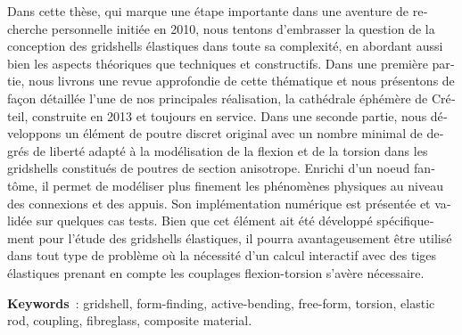 \begin{otherlanguage}{french}
Dans cette thèse, qui marque une étape importante dans une aventure de recherche personnelle initiée en 2010, nous tentons d'embrasser la question de la conception des gridshells élastiques dans toute sa complexité, en abordant aussi bien les aspects théoriques que techniques et constructifs. Dans une première partie, nous livrons une revue approfondie de cette thématique et nous présentons de façon détaillée l'une de nos principales réalisation, la cathédrale éphémère de Créteil, construite en 2013 et toujours en service. Dans une seconde partie, nous développons un élément de poutre discret original avec un nombre minimal de degrés de liberté adapté à la modélisation de la flexion et de la torsion dans les gridshells constitués de poutres de section anisotrope. Enrichi d'un noeud fantôme, il permet de modéliser plus finement les phénomènes physiques au niveau des connexions et des appuis. Son implémentation numérique est présentée et validée sur quelques cas tests. Bien que cet élément ait été développé spécifiquement pour l'étude des gridshells élastiques, il pourra avantageusement être utilisé dans tout type de problème où la nécessité d'un calcul interactif avec des tiges élastiques prenant en compte les couplages flexion-torsion s'avère nécessaire.

\textbf{Keywords}~: gridshell, form-finding, active-bending, free-form, torsion, elastic rod, coupling, fibreglass, composite material.

\end{otherlanguage}
